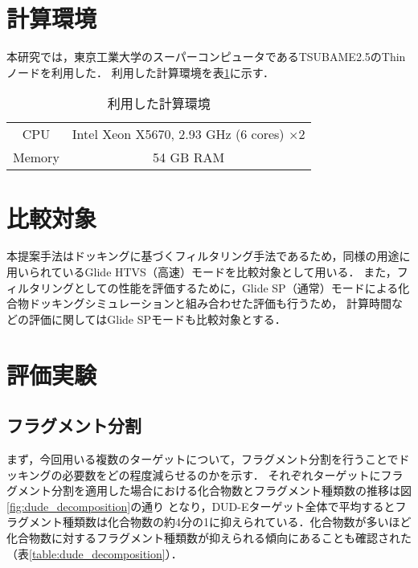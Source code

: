 \section{計算環境}
本研究では，東京工業大学のスーパーコンピュータであるTSUBAME2.5のThinノードを利用した．
利用した計算環境を表\ref{table:computer_node}に示す．

\begin{table}[htb] \centering
	\caption{利用した計算環境}
	\label{table:computer_node}
	\begin{tabular}{cc}
	\hline
	CPU		&Intel Xeon X5670, 2.93 GHz (6 cores) $\times2$ \\
	Memory	& 54 GB RAM \\ \hline 
	\end{tabular}
\end{table}

\section{比較対象}
本提案手法はドッキングに基づくフィルタリング手法であるため，同様の用途に用いられているGlide HTVS（高速）モードを比較対象として用いる．
また，フィルタリングとしての性能を評価するために，Glide SP（通常）モードによる化合物ドッキングシミュレーションと組み合わせた評価も行うため，
計算時間などの評価に関してはGlide SPモードも比較対象とする．

\section{評価実験}

\subsection{フラグメント分割}\label{subsec:result_decomposition}
まず，今回用いる複数のターゲットについて，フラグメント分割を行うことでドッキングの必要数をどの程度減らせるのかを示す．
それぞれターゲットにフラグメント分割を適用した場合における化合物数とフラグメント種類数の推移は図\ref{fig:dude_decomposition}の通り
となり，DUD-Eターゲット全体で平均するとフラグメント種類数は化合物数の約4分の1に抑えられている．化合物数が多いほど
化合物数に対するフラグメント種類数が抑えられる傾向にあることも確認された（表\ref{table:dude_decomposition}）．

